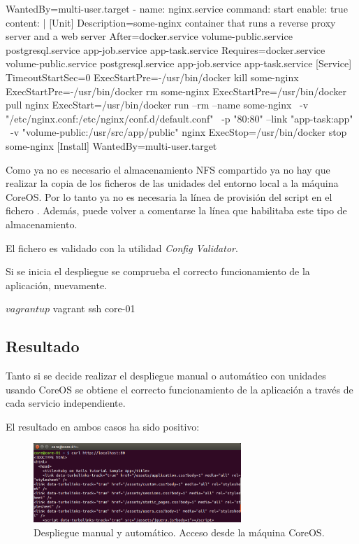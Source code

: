 \begin{codelisting}
\begin{code}
      [Install] 
      WantedBy=multi-user.target
  - name: nginx.service
    command: start
    enable: true
    content: |
      [Unit] 
      Description=some-nginx container that runs a reverse proxy server and 
                  a web server
      After=docker.service volume-public.service postgresql.service 
            app-job.service app-task.service
      Requires=docker.service volume-public.service postgresql.service 
               app-job.service app-task.service
      [Service] 
      TimeoutStartSec=0 
      ExecStartPre=-/usr/bin/docker kill some-nginx 
      ExecStartPre=-/usr/bin/docker rm some-nginx
      ExecStartPre=/usr/bin/docker pull nginx 
      ExecStart=/usr/bin/docker run --rm --name some-nginx \
      -v "/etc/nginx.conf:/etc/nginx/conf.d/default.conf" \
      -p "80:80" --link "app-task:app" \
      -v "volume-public:/usr/src/app/public" nginx 
      ExecStop=/usr/bin/docker stop some-nginx
      [Install] 
      WantedBy=multi-user.target
  \end{code}
\end{codelisting}

Como ya no es necesario el almacenamiento NFS compartido ya no hay que realizar la copia de los ficheros de las unidades del entorno local a la máquina CoreOS. Por lo tanto ya no es necesaria la línea de provisión del script en el fichero . Además, puede volver a comentarse la línea que habilitaba este tipo de almacenamiento.

El fichero es validado con la utilidad \textit{Config Validator}. 

Si se inicia el despliegue se comprueba el correcto funcionamiento de la aplicación, nuevamente.

\begin{code}
$ vagrant up
$ vagrant ssh core-01
\end{code}

\subsection{Resultado}

Tanto si se decide realizar el despliegue manual o automático con unidades usando CoreOS se obtiene el correcto funcionamiento de la aplicación a través de cada servicio independiente.

El resultado en ambos casos ha sido positivo:

\begin{figure}[H]
\centering
\includegraphics[width=0.7\textwidth]{images/figures/coreosmanualcurl.png}
\caption{Despliegue manual y automático. Acceso desde la máquina CoreOS.\label{fig:figure_placement_example}}
\end{figure}

